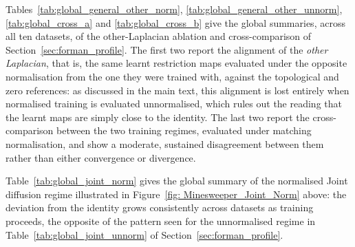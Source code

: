 Tables~\ref{tab:global_general_other_norm}, \ref{tab:global_general_other_unnorm}, \ref{tab:global_cross_a} and \ref{tab:global_cross_b} give the global summaries, across all ten datasets, of the other-Laplacian ablation and cross-comparison of Section~\ref{sec:forman_profile}. The first two report the alignment of the \emph{other Laplacian}, that is, the same learnt restriction maps evaluated under the opposite normalisation from the one they were trained with, against the topological and zero references: as discussed in the main text, this alignment is lost entirely when normalised training is evaluated unnormalised, which rules out the reading that the learnt maps are simply close to the identity. The last two report the cross-comparison between the two training regimes, evaluated under matching normalisation, and show a moderate, sustained disagreement between them rather than either convergence or divergence.









Table~\ref{tab:global_joint_norm} gives the global summary of the normalised Joint diffusion regime illustrated in Figure~\ref{fig: Minesweeper_Joint_Norm} above: the deviation from the identity grows consistently across datasets as training proceeds, the opposite of the pattern seen for the unnormalised regime in Table~\ref{tab:global_joint_unnorm} of Section~\ref{sec:forman_profile}.


